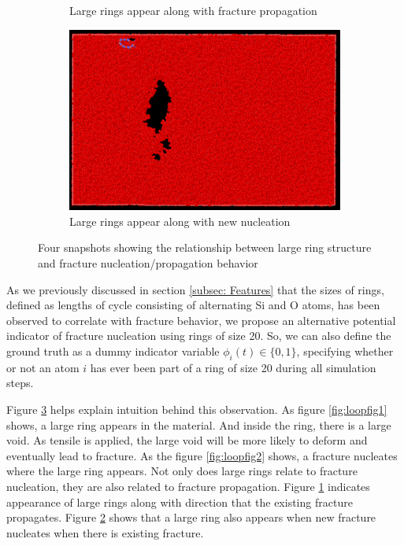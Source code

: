 \begin{figure}
\begin{subfigure}{.5\textwidth}
      \caption{Large rings appear along with fracture propagation}
      \label{fig:loopfig3}
    \end{subfigure}
    \begin{subfigure}{.5\textwidth}
      \centering
      \includegraphics[width=.8\linewidth]{images/fp1_propa2.png}
      \caption{Large rings appear along with new nucleation}
      \label{fig:loopfig4}
    \end{subfigure}
    
    \caption{Four snapshots showing the relationship between large ring structure and fracture nucleation/propagation behavior}
    \label{fig:loopfig}
    \end{figure}
    
    As we previously discussed in section \ref{subsec: Features} that the sizes of rings, defined as lengths of cycle consisting of alternating Si and O atoms, has been observed to correlate with fracture behavior, we propose an alternative potential indicator of fracture nucleation using rings of size 20. So, we can also define the ground truth as a dummy indicator variable $\phi_i(t) \in\{0,1\}$, specifying whether or not an atom $i$ has ever been part of a ring of size 20 during all simulation steps.
    
    Figure \ref{fig:loopfig} helps explain intuition behind this observation. As figure \ref{fig:loopfig1} shows, a large ring appears in the material. And inside the ring, there is a large void. As tensile is applied, the large void will be more likely to deform and eventually lead to fracture. As the figure \ref{fig:loopfig2} shows, a fracture nucleates where the large ring appears. Not only does large rings relate to fracture nucleation, they are also related to fracture propagation. Figure \ref{fig:loopfig3} indicates appearance of large rings along with direction that the existing fracture propagates. Figure \ref{fig:loopfig4} shows that a large ring also appears when new fracture nucleates when there is existing fracture.

